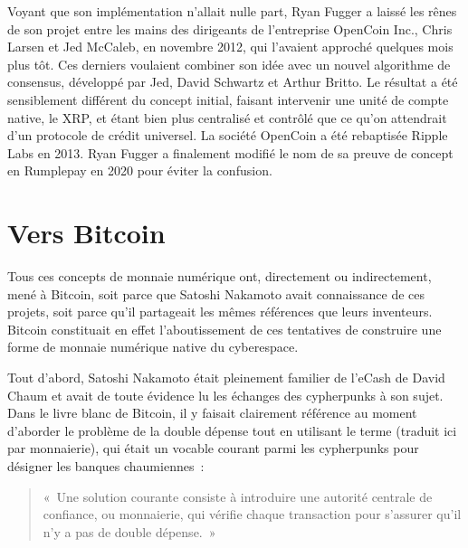 Voyant que son implémentation n'allait nulle part, Ryan Fugger a laissé les rênes de son projet entre les mains des dirigeants de l'entreprise OpenCoin Inc., Chris Larsen et Jed McCaleb, en novembre 2012, qui l'avaient approché quelques mois plus tôt. Ces derniers voulaient combiner son idée avec un nouvel algorithme de consensus, développé par Jed, David Schwartz et Arthur Britto. Le résultat a été sensiblement différent du concept initial, faisant intervenir une unité de compte native, le XRP, et étant bien plus centralisé et contrôlé que ce qu'on attendrait d'un protocole de crédit universel. La société OpenCoin a été rebaptisée Ripple Labs en 2013. Ryan Fugger a finalement modifié le nom de sa preuve de concept en Rumplepay en 2020 pour éviter la confusion.

\section*{Vers Bitcoin}

Tous ces concepts de monnaie numérique ont, directement ou indirectement, mené à Bitcoin, soit parce que Satoshi Nakamoto avait connaissance de ces projets, soit parce qu'il partageait les mêmes références que leurs inventeurs. Bitcoin constituait en effet l'aboutissement de ces tentatives de construire une forme de monnaie numérique native du cyberespace.

Tout d'abord, Satoshi Nakamoto était pleinement familier de l'eCash de David Chaum et avait de toute évidence lu les échanges des cypherpunks à son sujet. Dans le livre blanc de Bitcoin, il y faisait clairement référence au moment d'aborder le problème de la double dépense tout en utilisant le terme  (traduit ici par monnaierie), qui était un vocable courant parmi les cypherpunks pour désigner les banques chaumiennes~:

\begin{quote}
«~Une solution courante consiste à introduire une autorité centrale de confiance, ou monnaierie, qui vérifie chaque transaction pour s'assurer qu'il n'y a pas de double dépense.~»
\end{quote}


